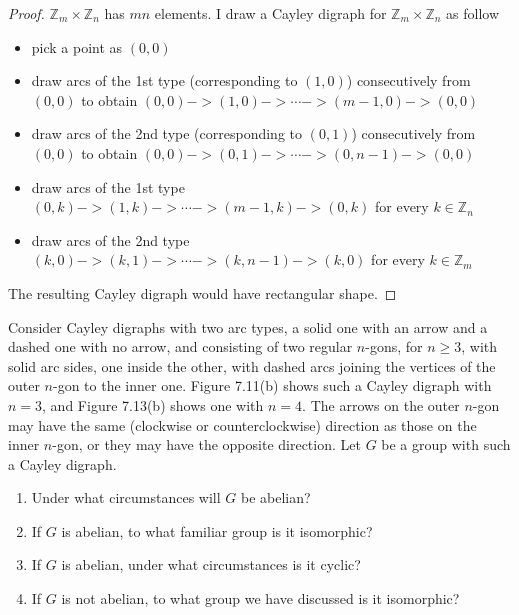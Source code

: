 \begin{proof}
    $\mathbb{Z}_{m}\times\mathbb{Z}_{n}$ has $mn$ elements. I draw a Cayley digraph for $\mathbb{Z}_{m}\times\mathbb{Z}_{n}$ as follow
    \begin{itemize}
        \item pick a point as $(0,0)$
        \item draw arcs of the 1st type (corresponding to $(1,0)$) consecutively from $(0,0)$ to obtain $(0,0) -> (1,0) -> \cdots -> (m-1,0) -> (0,0)$
        \item draw arcs of the 2nd type (corresponding to $(0,1)$) consecutively from $(0,0)$ to obtain $(0,0) -> (0,1) -> \cdots -> (0,n-1) -> (0,0)$
        \item draw arcs of the 1st type $(0,k) -> (1,k) -> \cdots -> (m-1,k) -> (0,k)$ for every $k\in\mathbb{Z}_{n}$
        \item draw arcs of the 2nd type $(k,0) -> (k,1) -> \cdots -> (k,n-1) -> (k,0)$ for every $k\in\mathbb{Z}_{m}$
    \end{itemize}

    The resulting Cayley digraph would have rectangular shape.
\end{proof}

\newpage
\begin{exercise}
    Consider Cayley digraphs with two arc types, a solid one with an arrow and a dashed one with no arrow, and consisting of two regular $n$-gons, for $n\geq 3$, with solid arc sides, one inside the other, with dashed arcs joining the vertices of the outer $n$-gon to the inner one. Figure 7.11(b) shows such a Cayley digraph with $n = 3$, and Figure 7.13(b) shows one with $n = 4$. The arrows on the outer $n$-gon may have the same (clockwise or counterclockwise) direction as those on the inner $n$-gon, or they may have the opposite direction. Let $G$ be a group with such a Cayley digraph.
    \begin{enumerate}[label={\textbf{\alph*.}}]
        \item Under what circumstances will $G$ be abelian?
        \item If $G$ is abelian, to what familiar group is it isomorphic?
        \item If $G$ is abelian, under what circumstances is it cyclic?
        \item If $G$ is not abelian, to what group we have discussed is it isomorphic?
    \end{enumerate}
\end{exercise}

